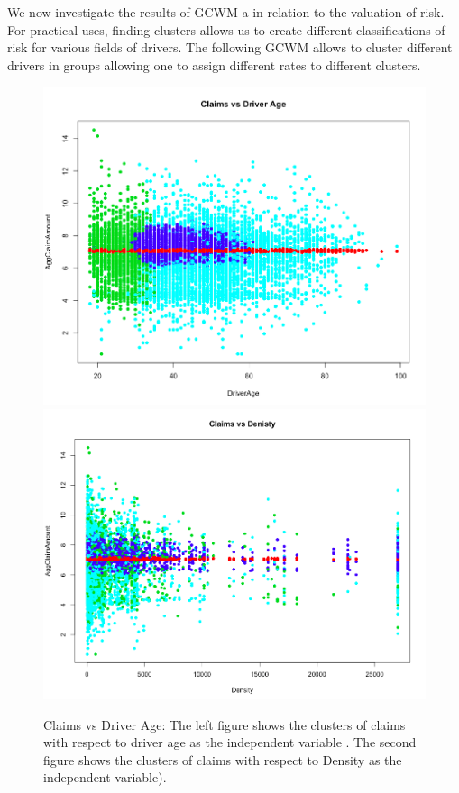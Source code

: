 \documentclass[11pt,letterpaper]{article}
\numberwithin{equation}{section}
\numberwithin{equation}{section}
\numberwithin{equation}{section}
\begin{document}
	We now investigate the results of GCWM a in relation to the valuation of risk. For practical uses, finding clusters allows us to create different classifications of risk for various fields of drivers. The following GCWM allows to cluster different drivers in groups allowing one to assign different rates to different clusters. 
\begin{figure}[!htb]
\begin{center}
\includegraphics[scale=0.24]{clms.png}
\includegraphics[scale=0.24]{dens.png}
\end{center}
\caption{Claims vs Driver Age: The left figure shows the clusters of claims with respect to driver age as the independent variable . The second figure shows the clusters of claims with respect to Density as the independent variable).}
\label{fig:vet1}
\end{figure}
\end{document}
